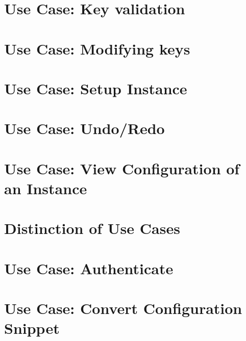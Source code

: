 \documentclass[twoside]{book}
\newcommand{\+}{\discretionary{\mbox{\scriptsize$\hookleftarrow$}}{}{}}
\begin{document}
\chapter{Use Case\+: Key validation}
\label{doc_usecases_elektra_web_UC_key_validation_md}

\chapter{Use Case\+: Modifying keys}
\label{doc_usecases_elektra_web_UC_modifying_keys_md}

\chapter{Use Case\+: Setup Instance}
\label{doc_usecases_elektra_web_UC_setup_instance_md}

\chapter{Use Case\+: Undo/\+Redo}
\label{doc_usecases_elektra_web_UC_undo_redo_md}

\chapter{Use Case\+: View Configuration of an Instance}
\label{doc_usecases_elektra_web_UC_view_config_md}

\chapter{Distinction of Use Cases}
\label{doc_usecases_snippet_sharing_distinction_use_cases_md}

\chapter{Use Case\+: Authenticate}
\label{doc_usecases_snippet_sharing_UC_authenticate_md}

\chapter{Use Case\+: Convert Configuration Snippet}
\label{doc_usecases_snippet_sharing_UC_convert_snippet_md}

\end{document}
